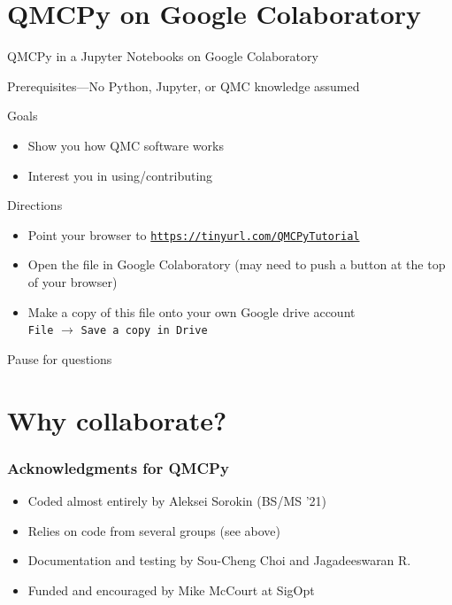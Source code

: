\documentclass[11pt,compress,xcolor={usenames,dvipsnames},aspectratio=169]{beamer}
\begin{document}
\section{QMCPy on Google Colaboratory}
\begin{frame}{QMCPy in a Jupyter Notebooks on Google Colaboratory}
	\vspace{-4ex}
	
	\alert{Prerequisites}---No Python, Jupyter, or QMC knowledge assumed
	
	\vspace{-1ex}
	
	\alert{Goals}
	
		\vspace{-3ex}
		\begin{itemize}
		\item Show you how QMC software works
		\item Interest you in using/contributing
	\end{itemize}
	
	\vspace{-1ex}

	\alert{Directions}
	
	\vspace{-3ex}
	\begin{itemize}
		\item Point your browser to \href{https://tinyurl.com/QMCPyTutorial}{\nolinkurl{https://tinyurl.com/QMCPyTutorial}}
		\item Open the file in Google Colaboratory (may need to push a button at the top of your browser)
		\item Make a copy of this file onto your own Google drive account \\
		\texttt{File} $\rightarrow$ \texttt{Save a copy in Drive}
	\end{itemize}



\alert{Pause for questions}
\end{frame}

\section{Why collaborate?}

\begin{frame}
	\frametitle{Acknowledgments for QMCPy}
	
	\begin{itemize}
		\item Coded almost entirely by Aleksei Sorokin (BS/MS '21)
		
		\item Relies on code from several groups (see above)
		
		\item Documentation and testing by Sou-Cheng Choi and Jagadeeswaran R.
		
		\item Funded and encouraged by Mike McCourt at SigOpt
	\end{itemize}
\end{frame}
\end{document}
